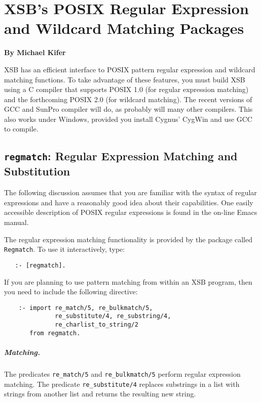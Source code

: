 \chapter{XSB's POSIX Regular Expression and Wildcard Matching Packages}
\label{chap-posix}

\begin{center}
{\Large {\bf By Michael Kifer}}
\end{center}

XSB has an efficient interface to POSIX pattern regular expression and
wildcard matching functions.  To take advantage of these features, you must
build XSB using a C compiler that supports POSIX 1.0 (for regular
expression matching) and the forthcoming POSIX 2.0 (for wildcard matching).
The recent versions of GCC and SunPro compiler will do, as probably will
many other compilers. This also works under Windows, provided you install
Cygnus' CygWin and use GCC to compile.

\section{{\tt regmatch}: Regular Expression Matching and Substitution}

The following discussion assumes that you are familiar with the syntax of
regular expressions and have a reasonably good idea about their
capabilities. One easily accessible description of POSIX regular
expressions is found in the on-line Emacs manual.

The regular expression matching functionality is provided by the package
called {\tt Regmatch}. To use it interactively, type:
\begin{verbatim}
   :- [regmatch].
\end{verbatim}

If you are planning to use pattern matching from within an XSB program,
then you need to include the following directive:
\begin{verbatim}
    :- import re_match/5, re_bulkmatch/5,
              re_substitute/4, re_substring/4,
              re_charlist_to_string/2
       from regmatch.
\end{verbatim}

\paragraph{Matching.}
The predicates \verb|re_match/5| and \verb|re_bulkmatch/5| perform regular
expression matching.  The predicate \verb|re_substitute/4| replaces
substrings in a list with strings from another list and returns the
resulting new string.

